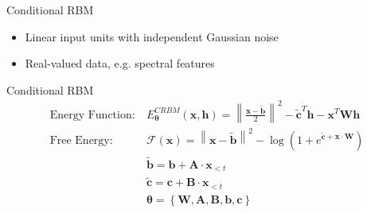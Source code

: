 	\begin{frame}{Conditional RBM}
	    \begin{itemize}
	     \item<1->Linear input units with independent Gaussian noise \pause
	     \item<2>Real-valued data, e.g. spectral features
	    \end{itemize}


	\end{frame}
	
	\begin{frame}[t]{Conditional RBM}
	      \begin{align}
		\text{Energy Function:}~&E^{CRBM}_{\boldsymbol{\theta}} (\mathbf{x}, \mathbf{h})  = \left\| \frac{\mathbf{x} - \tilde{\mathbf{b}}}{2} \right\|^{2}
      -\tilde{\mathbf{c}}^T \mathbf{h}-\mathbf{x}^{T} \mathbf{W}\mathbf{h} \nonumber\\
		\text{Free Energy:}~&\mathcal{F}(\mathbf{x}) = \left\| \mathbf{x} - \tilde{\mathbf{b}} \right\|^{2} - \log (1+e^{\tilde{\mathbf{c}}+\mathbf{x}\cdot \mathbf{W}})\nonumber\\
		&\tilde{\mathbf{b}} = \mathbf{b} + \mathbf{A}\cdot \mathbf{x}_{<t}\nonumber\\
		&\tilde{\mathbf{c}} = \mathbf{c} + \mathbf{B}\cdot \mathbf{x}_{<t}\nonumber\\
		&\boldsymbol{\theta} = \left \{\mathbf{W,A,B,b,c} \right\}\nonumber
	      \end{align}
	\end{frame}
	


